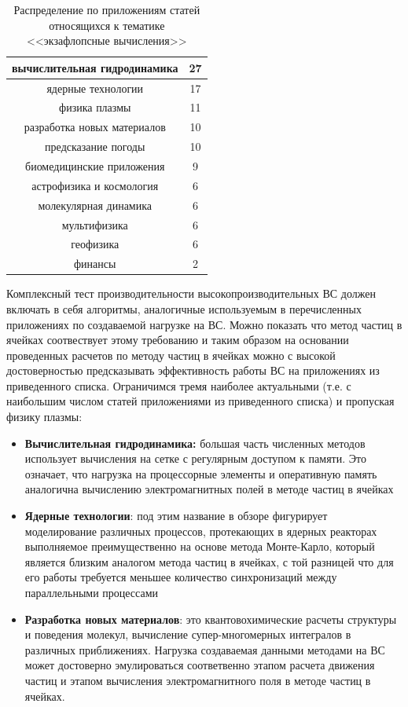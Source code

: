 \begin{table}[ht]
	\caption{Распределение по приложениям статей относящихся к тематике <<экзафлопсные вычисления>>}
	\begin{center}
		\begin{tabular}{|c|c|}
			\hline
			вычислительная гидродинамика & 27  \\ \hline 
			ядерные технологии & 17       \\ \hline  
			физика плазмы & 11  \\ \hline 
			разработка новых материалов & 10  \\ \hline 
			предсказание погоды & 10 \\ \hline 
			биомедицинские приложения & 9 \\ \hline 
			астрофизика и космология & 6  \\ \hline 
			молекулярная динамика   & 6   \\ \hline 
			мультифизика & 6              \\ \hline 
			геофизика & 6  \\ \hline 
			финансы & 2  \\ \hline 
		\end{tabular}
	\end{center}
	\label{tab_physics}
\end{table}
Комплексный тест производительности высокопроизводительных ВС должен включать в себя алгоритмы, аналогичные используемым в перечисленных приложениях по создаваемой нагрузке на ВС. Можно показать что метод частиц в ячейках соотвествует этому требованию и таким образом на основании проведенных расчетов по методу частиц в ячейках можно с высокой достоверностью предсказывать эффективность работы ВС на приложениях из приведенного списка. Ограничимся тремя наиболее актуальными (т.е. с наибольшим числом статей приложениями из приведенного списка) и пропуская физику плазмы:
\begin{itemize}
	\item \textbf{Вычислительная гидродинамика:} большая часть численных методов использует вычисления на сетке с регулярным доступом к памяти. Это означает, что нагрузка на процессорные элементы и оперативную память аналогична вычислению электромагнитных полей в методе частиц в ячейках
	\item \textbf{Ядерные технологии}: под этим название в обзоре фигурирует моделирование различных процессов, протекающих в ядерных реакторах выполняемое преимущественно на основе метода Монте-Карло, который является близким аналогом метода частиц в ячейках, с той разницей что для его работы требуется меньшее количество синхронизаций между параллельными процессами
	\item \textbf{Разработка новых материалов}: это квантовохимические расчеты структуры и поведения молекул, вычисление супер-многомерных интегралов в различных приближениях. Нагрузка создаваемая данными методами на ВС может достоверно эмулироваться соответвенно этапом расчета движения частиц и этапом вычисления электромагнитного поля в методе частиц в ячейках.
\end{itemize}	    	
